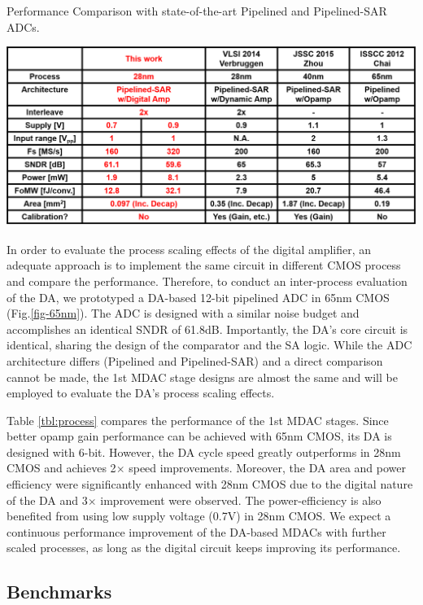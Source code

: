 \begin{table}[!]
\centering
  \caption{Performance Comparison with state-of-the-art Pipelined and Pipelined-SAR ADCs.}
  \label{tbl:performancecomp}
 \includegraphics[width=1\textwidth]{figure/chap2/performancecomp.png}
\end{table}
In order to evaluate the process scaling effects of the digital amplifier, an adequate approach is to implement the same circuit in different CMOS process and compare the performance.
Therefore, to conduct an inter-process evaluation of the DA, we prototyped a DA-based 12-bit pipelined ADC in 65nm CMOS (Fig.\ref{fig-65nm}). The ADC is designed with a similar noise budget and accomplishes an identical SNDR of 61.8dB. Importantly, the DA's core circuit is identical, sharing the design of the comparator and the SA logic. While the ADC architecture differs (Pipelined and Pipelined-SAR) and a direct comparison cannot be made, the 1st MDAC stage designs are almost the same and will be employed to evaluate the DA's process scaling effects.

Table \ref{tbl:process} compares the performance of the 1st MDAC stages. Since better opamp gain performance can be achieved with 65nm CMOS, its DA is designed with 6-bit. However, the DA cycle speed greatly outperforms in 28nm CMOS and achieves 2$\times$ speed improvements. Moreover, the DA area and power efficiency were significantly enhanced with 28nm CMOS due to the digital nature of the DA and 3$\times$ improvement were observed. The power-efficiency is also benefited from using low supply voltage (0.7V) in 28nm CMOS. We expect a continuous performance improvement of the DA-based MDACs with further scaled processes, as long as the digital circuit keeps improving its performance. 

\subsection{Benchmarks}

